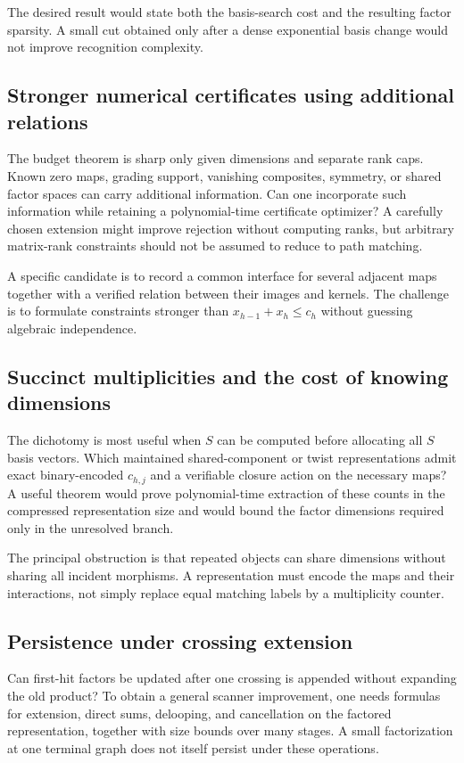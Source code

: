 \documentclass[11pt,letterpaper]{article}
\theoremstyle{definition}\newtheorem{definition}[theorem]{Definition}
\theoremstyle{remark}\newtheorem{remark}[theorem]{Remark}
\begin{document}
The desired result would state both the basis-search cost and the resulting
factor sparsity. A small cut obtained only after a dense exponential basis
change would not improve recognition complexity.

\subsection{Stronger numerical certificates using additional relations}
The budget theorem is sharp only given dimensions and separate rank caps.
Known zero maps, grading support, vanishing composites, symmetry, or shared
factor spaces can carry additional information. Can one incorporate such
information while retaining a polynomial-time certificate optimizer?
A carefully chosen extension might improve rejection without computing
ranks, but arbitrary matrix-rank constraints should not be assumed to reduce
to path matching.

A specific candidate is to record a common interface for several adjacent
maps together with a verified relation between their images and kernels.
The challenge is to formulate constraints stronger than
$x_{h-1}+x_h\leq c_h$ without guessing algebraic independence.

\subsection{Succinct multiplicities and the cost of knowing dimensions}
The dichotomy is most useful when $S$ can be computed before allocating all
$S$ basis vectors. Which maintained shared-component or twist representations
admit exact binary-encoded $c_{h,j}$ and a verifiable closure action on the
necessary maps? A useful theorem would prove polynomial-time extraction of
these counts in the compressed representation size and would bound the
factor dimensions required only in the unresolved branch.

The principal obstruction is that repeated objects can share dimensions
without sharing all incident morphisms. A representation must encode the
maps and their interactions, not simply replace equal matching labels by a
multiplicity counter.

\subsection{Persistence under crossing extension}
Can first-hit factors be updated after one crossing is appended without
expanding the old product? To obtain a general scanner improvement, one
needs formulas for extension, direct sums, delooping, and cancellation on
the factored representation, together with size bounds over many stages.
A small factorization at one terminal graph does not itself persist under
these operations.
\end{document}
